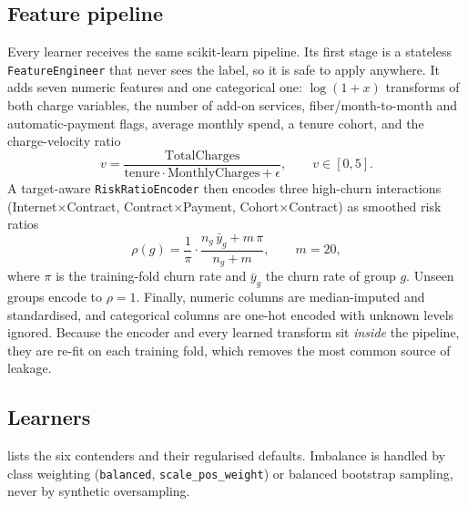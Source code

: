\documentclass[conference]{IEEEtran}
\newcommand{\code}[1]{\texttt{#1}}
\begin{document}
\subsection{Feature pipeline}
Every learner receives the same scikit-learn pipeline. Its first stage is a stateless
\code{FeatureEngineer} that never sees the label, so it is safe to apply anywhere. It adds
seven numeric features and one categorical one: $\log(1+x)$ transforms of both charge
variables, the number of add-on services, fiber/month-to-month and automatic-payment flags,
average monthly spend, a tenure cohort, and the charge-velocity ratio
\begin{equation}
  v = \frac{\text{TotalCharges}}{\text{tenure}\cdot\text{MonthlyCharges}+\epsilon},\qquad v\in[0,5].
  \label{eq:velocity}
\end{equation}
A target-aware \code{RiskRatioEncoder} then encodes three high-churn interactions
(Internet$\times$Contract, Contract$\times$Payment, Cohort$\times$Contract) as smoothed risk ratios
\begin{equation}
  \rho(g)=\frac{1}{\pi}\cdot\frac{n_g\,\bar y_g+m\,\pi}{n_g+m},\qquad m=20,
  \label{eq:riskratio}
\end{equation}
where $\pi$ is the training-fold churn rate and $\bar y_g$ the churn rate of group $g$. Unseen
groups encode to $\rho=1$. Finally, numeric columns are median-imputed and standardised, and
categorical columns are one-hot encoded with unknown levels ignored. Because the encoder and
every learned transform sit \emph{inside} the pipeline, they are re-fit on each training fold,
which removes the most common source of leakage.

\subsection{Learners}
 lists the six contenders and their regularised defaults. Imbalance is handled
by class weighting (\code{balanced}, \code{scale\_pos\_weight}) or balanced bootstrap sampling,
never by synthetic oversampling.
\end{document}
